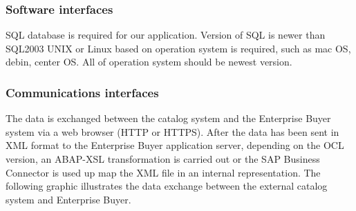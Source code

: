 
\subsubsection{Software interfaces}
SQL database is required for our application. Version of SQL is newer than SQL2003
UNIX or Linux based on operation system is required, such as mac OS, debin, center OS. All of operation system should be newest version.




\subsubsection{Communications interfaces}
The data is exchanged between the catalog system and the Enterprise Buyer system via a web browser (HTTP or HTTPS).
After the data has been sent in XML format to the Enterprise Buyer application server, depending on the OCL version, 
an ABAP-XSL transformation is carried out or the SAP Business Connector is used up map the XML file in an internal representation. 
The following graphic illustrates the data exchange between the external catalog system and Enterprise Buyer. 

